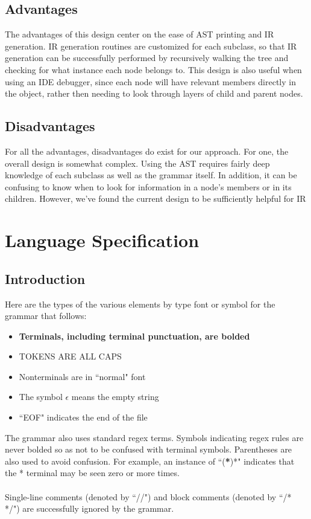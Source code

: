 \documentclass{scrartcl}
\begin{document}
\subsection{Advantages}
The advantages of this design center on the ease of AST printing and IR generation. IR generation routines are customized for each subclass, so that IR generation can be successfully performed by recursively walking the tree and checking for what instance each node belongs to. This design is also useful when using an IDE debugger, since each node will have relevant members directly in the object, rather then needing to look through layers of child and parent nodes.\\
\subsection{Disadvantages}
For all the advantages, disadvantages do exist for our approach. For one, the overall design is somewhat complex. Using the AST requires fairly deep knowledge of each subclass as well as the grammar itself. In addition, it can be confusing to know when to look for information in a node's members or in its children. However, we've found the current design to be sufficiently helpful for IR

\section{Language Specification}
\subsection{Introduction}
Here are the types of the various elements by type font or symbol for the grammar that follows:
\begin{itemize}
    \item \textbf{Terminals, including terminal punctuation, are bolded}
    \item TOKENS ARE ALL CAPS
    \item Nonterminals are in ``normal" font
    \item The symbol $\epsilon$ means the empty string
    \item ``EOF" indicates the end of the file
\end{itemize}
The grammar also uses standard regex terms. Symbols indicating regex rules are never bolded so as not to be confused with terminal symbols. Parentheses are also used to avoid confusion. For example, an instance of ``(\textbf{*})*" indicates that the * terminal may be seen zero or more times.\\
\\
Single-line comments (denoted by ``//") and block comments (denoted by ``/* */") are successfully ignored by the grammar.
\end{document}
